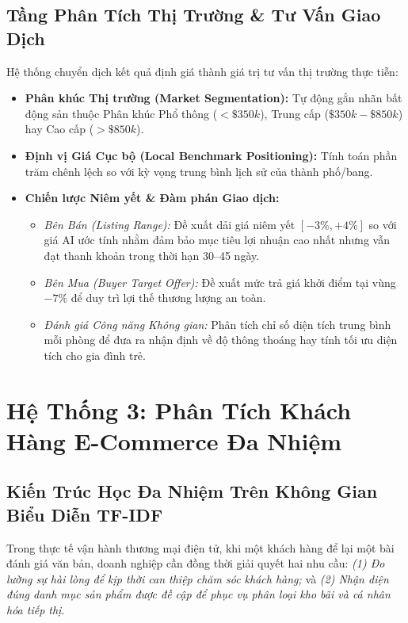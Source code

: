 \documentclass[12pt,a4paper]{report}
\begin{document}
\section{Tầng Phân Tích Thị Trường \& Tư Vấn Giao Dịch}
Hệ thống chuyển dịch kết quả định giá thành giá trị tư vấn thị trường thực tiễn:
\begin{itemize}[leftmargin=2em]
    \item \textbf{Phân khúc Thị trường (Market Segmentation):} Tự động gắn nhãn bất động sản thuộc Phân khúc Phổ thông ($< \$350k$), Trung cấp ($\$350k - \$850k$) hay Cao cấp ($> \$850k$).
    \item \textbf{Định vị Giá Cục bộ (Local Benchmark Positioning):} Tính toán phần trăm chênh lệch so với kỳ vọng trung bình lịch sử của thành phố/bang.
    \item \textbf{Chiến lược Niêm yết \& Đàm phán Giao dịch:}
    \begin{itemize}
        \item \textit{Bên Bán (Listing Range):} Đề xuất dải giá niêm yết $[-3\%, +4\%]$ so với giá AI ước tính nhằm đảm bảo mục tiêu lợi nhuận cao nhất nhưng vẫn đạt thanh khoản trong thời hạn 30--45 ngày.
        \item \textit{Bên Mua (Buyer Target Offer):} Đề xuất mức trả giá khởi điểm tại vùng $-7\%$ để duy trì lợi thế thương lượng an toàn.
        \item \textit{Đánh giá Công năng Không gian:} Phân tích chỉ số diện tích trung bình mỗi phòng để đưa ra nhận định về độ thông thoáng hay tính tối ưu diện tích cho gia đình trẻ.
    \end{itemize}
\end{itemize}

\chapter{Hệ Thống 3: Phân Tích Khách Hàng E-Commerce Đa Nhiệm}

\section{Kiến Trúc Học Đa Nhiệm Trên Không Gian Biểu Diễn TF-IDF}
Trong thực tế vận hành thương mại điện tử, khi một khách hàng để lại một bài đánh giá văn bản, doanh nghiệp cần đồng thời giải quyết hai nhu cầu: \textit{(1) Đo lường sự hài lòng để kịp thời can thiệp chăm sóc khách hàng;} và \textit{(2) Nhận diện đúng danh mục sản phẩm được đề cập để phục vụ phân loại kho bãi và cá nhân hóa tiếp thị}.
\end{document}
